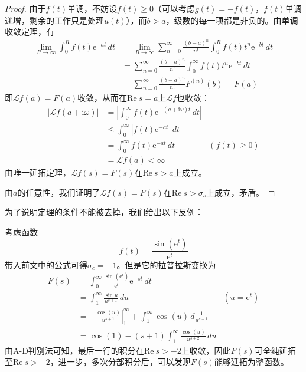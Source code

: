 \documentclass{ctexbook}
\newcommand{\evalat}[3]{\left.#1\right|_{#2}^{#3}}
\begin{document}
\begin{proof}
    由于$f(t)$单调，不妨设$f(t)\geq 0$（可以考虑$g(t)=-f(t)$，$f(t)$单调递增，剩余的工作只是处理$u(t)$），而$b>a$，级数的每一项都是非负的。由单调收敛定理，有
    \begin{align*}
        \lim_{R\to\infty}\int_{0}^{R}f(t)\mathrm{e}^{-a t}\,dt&=\lim_{R\to\infty}\sum_{n=0}^{\infty}\frac{(b-a)^n}{n!}\int_{0}^{R}f(t)t^n \mathrm{e}^{-b t}\,dt\\
        &=\sum_{n=0}^{\infty}\frac{(b-a)^n}{n!}\int_{0}^{\infty}f(t)t^n \mathrm{e}^{-b t}\,dt\\
        &=\sum_{n=0}^{\infty}\frac{(b-a)^n}{n!}F^{(n)}(b)=F(a)
    \end{align*}
    即$\mathcal{L} f(a)=F(a)$收敛，从而在$\text{Re}\ s=a$上$\mathcal{L} f$也收敛：\begin{align*}
        |\mathcal{L} f(a+\mathrm{i}\omega)|&=\left|\int_{0}^{\infty}f(t)\mathrm{e}^{-(a+\mathrm{i}\omega) t}\,dt\right|\\
        &\leq \int_{0}^{\infty}\left|f(t)\mathrm{e}^{-a t}\right|\,dt\\
        &=\int_{0}^{\infty}f(t)\mathrm{e}^{-a t}\,dt&\left(f(t)\geq 0\right)\\
        &=\mathcal{L}f(a)<\infty
    \end{align*}
    由唯一延拓定理，$\mathcal{L} f(s)=F(s)$在$\text{Re}\ s>a$上成立。

    由$a$的任意性，我们证明了$\mathcal{L} f(s)=F(s)$在$\text{Re}\ s>\sigma_s$上成立，矛盾。
\end{proof}

为了说明定理的条件不能被去掉，我们给出以下反例\cite{Laplace_Transform}：
\begin{example}
    考虑函数
    \[f(t)=\frac{\sin(\mathrm{e}^t)}{\mathrm{e}^t}\]
    带入前文中的公式可得$\sigma_c=-1$。但是它的拉普拉斯变换为
    \begin{align*}
        F(s)&=\int_{0}^{\infty}\frac{\sin(\mathrm{e}^t)}{\mathrm{e}^t}\mathrm{e}^{-s t}\,dt\\
        &=\int_{1}^{\infty}\frac{\sin u}{u^{s+1}}\,du&(u=\mathrm{e}^t)\\
        &=-\evalat{\frac{\cos(u)}{u^{s+1}}}{1}{\infty}+\int_{1}^{\infty}\cos(u)\,d\frac{1}{u^{s+1}}\\
        &=\cos(1)-(s+1)\int_{1}^{\infty}\frac{\cos(u)}{u^{s+2}}\,du
    \end{align*}
    由A-D判别法可知，最后一行的积分在$\text{Re}\ s>-2$上收敛，因此$F(s)$可全纯延拓至$\text{Re}\ s>-2$，进一步，多次分部积分后，可以发现$F(s)$能够延拓为整函数。
\end{example}
\end{document}
